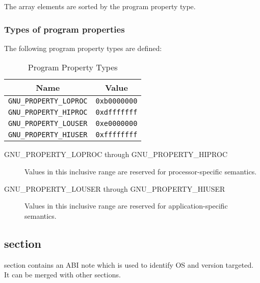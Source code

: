 The array elements are sorted by the program property type.

\subsubsection{Types of program properties}

The following program property types are defined:

\begin{table}[H]
\Hrule
  \caption{Program Property Types}
  \begin{center}
    \begin{tabular}[t]{l|l}
      \multicolumn{1}{c}{Name} & \multicolumn{1}{c}{Value} \\
      \hline
      \texttt{GNU_PROPERTY_LOPROC} & \texttt{0xb0000000} \\
      \texttt{GNU_PROPERTY_HIPROC} & \texttt{0xdfffffff} \\
      \texttt{GNU_PROPERTY_LOUSER} & \texttt{0xe0000000} \\
      \texttt{GNU_PROPERTY_HIUSER} & \texttt{0xffffffff} \\
    \end{tabular}
  \end{center}
\Hrule
\end{table}

\begin{description}
 \item[GNU_PROPERTY_LOPROC through GNU_PROPERTY_HIPROC]
   Values in this inclusive range are reserved for processor-specific
   semantics.
 \item[GNU_PROPERTY_LOUSER through GNU_PROPERTY_HIUSER]
   Values in this inclusive range are reserved for application-specific
   semantics.
\end{description}

\subsection{ section}
\label{sec_abi_tag}

 section contains an ABI note which is used to
identify OS and version targeted.  It can be merged with other
 sections.

